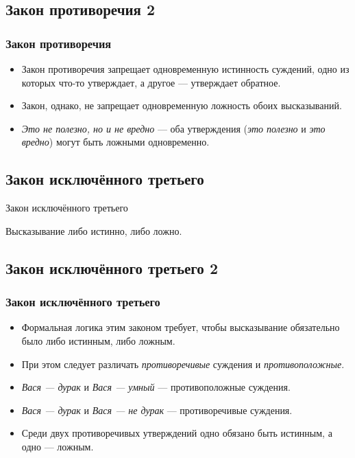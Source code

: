 \documentclass[compress,red]{beamer}
\begin{document}
\subsection{Закон противоречия 2}
\begin{frame}[fragile]
  \frametitle{Закон противоречия}
  \begin{itemize}
    \item Закон противоречия запрещает одновременную истинность суждений, одно из которых что-то утверждает, а другое --- утверждает обратное.
    \item Закон, однако, не запрещает одновременную ложность обоих высказываний.
    \item \emph{Это не полезно, но и не вредно} --- оба утверждения (\emph{это полезно} и \emph{это вредно}) могут быть ложными одновременно.
  \end{itemize}
\end{frame}

\subsection{Закон исключённого третьего}
\begin{frame}
  \begin{center}
    \Huge{Закон исключённого третьего}
  \end{center}
  \begin{center}
    \Large{Высказывание либо истинно, либо ложно.}
  \end{center}
\end{frame}

\subsection{Закон исключённого третьего 2}
\begin{frame}[fragile]
  \frametitle{Закон исключённого третьего}
  \begin{itemize}
    \item Формальная логика этим законом требует, чтобы высказывание обязательно было либо истинным, либо ложным.
    \item При этом следует различать \emph{противоречивые} суждения и \emph{противоположные}.
    \item \emph{Вася --- дурак} и \emph{Вася --- умный} --- противоположные суждения.
    \item \emph{Вася --- дурак} и \emph{Вася --- не дурак} --- противоречивые суждения.
    \item Среди двух противоречивых утверждений одно обязано быть истинным, а одно --- ложным.
  \end{itemize}
\end{frame}
\end{document}
